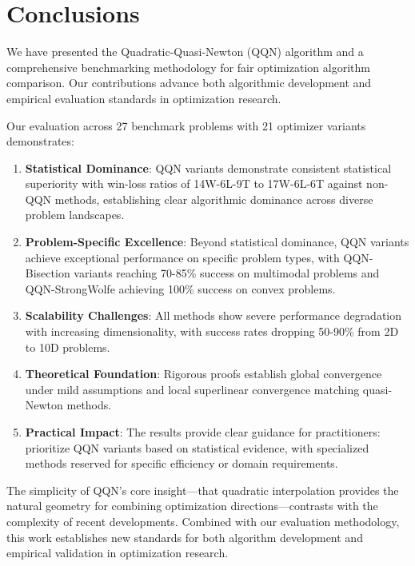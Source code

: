 \hypertarget{conclusions}{%
\section{Conclusions}\label{conclusions}}

We have presented the Quadratic-Quasi-Newton (QQN) algorithm and a comprehensive benchmarking methodology for fair optimization algorithm comparison. Our contributions advance both algorithmic development and empirical evaluation standards in optimization research.

Our evaluation across 27 benchmark problems with 21 optimizer variants demonstrates:

\begin{enumerate}
\def\labelenumi{\arabic{enumi}.}
\item
  \textbf{Statistical Dominance}: QQN variants demonstrate consistent statistical superiority with win-loss ratios of 14W-6L-9T to 17W-6L-6T against non-QQN methods, establishing clear algorithmic dominance across diverse problem landscapes.
\item
  \textbf{Problem-Specific Excellence}: Beyond statistical dominance, QQN variants achieve exceptional performance on specific problem types, with QQN-Bisection variants reaching 70-85\% success on multimodal problems and QQN-StrongWolfe achieving 100\% success on convex problems.
\item
  \textbf{Scalability Challenges}: All methods show severe performance degradation with increasing dimensionality, with success rates dropping 50-90\% from 2D to 10D problems.
\item
  \textbf{Theoretical Foundation}: Rigorous proofs establish global convergence under mild assumptions and local superlinear convergence matching quasi-Newton methods.
\item
  \textbf{Practical Impact}: The results provide clear guidance for practitioners: prioritize QQN variants based on statistical evidence, with specialized methods reserved for specific efficiency or domain requirements.
\end{enumerate}

The simplicity of QQN's core insight---that quadratic interpolation provides the natural geometry for combining optimization directions---contrasts with the complexity of recent developments.
Combined with our evaluation methodology, this work establishes new standards for both algorithm development and empirical validation in optimization research.

